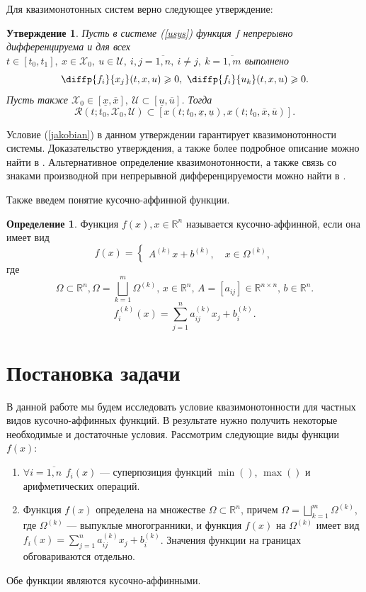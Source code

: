 \documentclass{article}
\renewcommand{\ge}{\geqslant}
\newtheorem{statement}{Утверждение}
\theoremstyle{definition}
\newtheorem{definition}{Определение}[section]
\begin{document}
Для квазимонотонных систем верно следующее утверждение:
\begin{statement}
    Пусть в системе (\ref{usys}) функция \(f\) непрерывно дифференцируема и для всех \(t \in [t_0,t_1],\ x \in \mathcal{X}_0,\ u \in \mathcal{U},\ i, j = \overline{1, n},\ i \neq j,\ k = \overline{1, m}\) выполнено
    \begin{equation} \label{jakobian}
    	\diffp{f_i}{{x_j}}(t, x, u) \ge 0,\ \diffp{f_i}{{u_k}}(t, x, u) \ge 0.
    \end{equation}
    Пусть также \(\mathcal{X}_0 \in [\underline{x}, \overline{x}],\ \mathcal{U} \subset [\underline{u},\overline{u}]\). Тогда
     \[
     	\mathcal{R}(t; t_0, \mathcal{X}_0, \mathcal{U}) \subset [x(t; t_0, \underline{x}, \underline{u}), x(t; t_0, \overline{x}, \overline{u})].
     \]
\end{statement}
Условие (\ref{jakobian}) в данном утверждении гарантирует квазимонотонности системы. Доказательство утверждения, а также более подробное описание можно найти в \cite{1}. Альтернативное определение квазимонотонности, а также связь со знаками производной при непрерывной дифференцируемости можно найти в \cite{2}.

Также введем понятие кусочно-аффинной функции.
\begin{definition}
	Функция \(f(x), x \in \mathbb{R}^n\) называется кусочно-аффинной, если она имеет вид
	\begin{equation} \label{pwadef}
		f(x) = \begin{cases}A^{(k)}x + b^{(k)},\quad x \in \Omega^{(k)},\end{cases}
	\end{equation}
	где
	\[\Omega \subset \mathbb{R}^n, \Omega = \bigsqcup_{k = 1}^m \Omega^{(k)},\, x \in \mathbb{R}^{n},\, A=[a_{ij}] \in \mathbb{R}^{n \times n},\, b \in \mathbb{R}^{n}.\]
	\[f_i^{(k)}(x) = \sum_{j=1}^{n} a_{ij}^{(k)}x_j + b_i^{(k)}.\]
\end{definition}

\section{Постановка задачи}
В данной работе мы будем исследовать условие квазимонотонности для частных видов кусочно-аффинных функций. В результате нужно получить некоторые необходимые и достаточные условия. Рассмотрим следующие виды функции \(f(x)\):
\begin{enumerate}
    \item \(\forall i = \overline{1,n}\ \, f_i(x) \) --- суперпозиция функций \(\min()\), \(\max()\) и арифметических операций.
    \item Функция \(f(x)\) определена на множестве \(\Omega \subset \mathbb{R}^n\), причем \(\Omega = \bigsqcup_{k = 1}^m \Omega^{(k)}\), где \(\Omega^{(k)}\) --- выпуклые многогранники, и функция \(f(x)\) на \(\Omega^{(k)}\) имеет вид \(f_i(x) = \sum_{j = 1}^{n} a_{ij}^{(k)}x_j + b_i^{(k)}\). Значения функции на границах обговариваются отдельно.
\end{enumerate}
Обе функции являются кусочно-аффинными.
\end{document}
